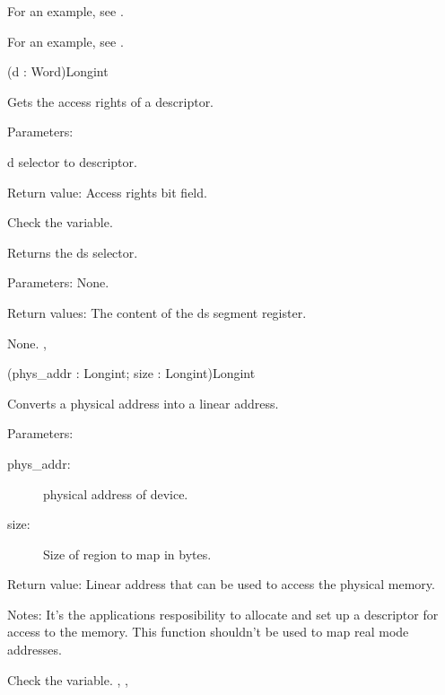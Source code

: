 For an example, see .


For an example, see .

{(d : Word)}{Longint}
{Gets the access rights of a descriptor.

Parameters: 
\begin{description}
\item{d} selector to descriptor.
\end{description}

Return value: Access rights bit field.
}
{Check the  variable.}{ 
}


{Returns the ds selector.

Parameters: None.

Return values: The content of the ds segment register.
}{ None.}{ , }

{(phys\_addr : Longint; size : Longint)}{Longint}
{Converts a physical address into a linear address.

Parameters: 
\begin{description}
\item [phys\_addr:\ ] physical address of device.
\item [size:\ ] Size of region to map in bytes.
\end{description}

Return value: Linear address that can be used to access the physical memory.

Notes: It's the applications resposibility to allocate and set up a
descriptor for access to the memory. This function shouldn't be used to map
real mode addresses.
}
{ Check the  variable.}
{ 
, ,
 }

